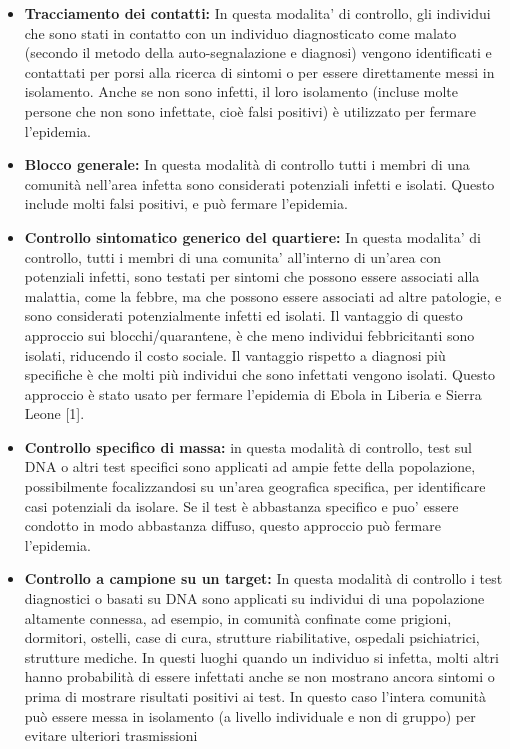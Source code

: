 \documentclass[onecolumn,journal]{IEEEtran}
\begin{document}
\begin{multicols}{2}
\begin{itemize}
  \item \textbf{Tracciamento dei contatti:} In questa modalita’ di controllo, gli individui che sono stati in contatto con un individuo diagnosticato come malato (secondo il metodo della auto-segnalazione e diagnosi) vengono identificati e contattati per porsi alla ricerca di sintomi o per essere direttamente messi in isolamento. Anche se non sono infetti, il loro isolamento (incluse molte persone che non sono infettate, cioè falsi positivi) è utilizzato per fermare l’epidemia.

  \item \textbf{Blocco generale:} In questa modalità di controllo tutti i membri di una comunità nell’area infetta sono considerati potenziali infetti e isolati. Questo include molti falsi positivi, e può fermare l’epidemia.

  \item \textbf{Controllo sintomatico generico del quartiere:} In questa modalita’ di controllo, tutti i membri di una comunita’ all’interno di un’area con potenziali infetti, sono testati per sintomi che possono essere associati alla malattia, come la febbre, ma che possono essere associati ad altre patologie, e sono considerati potenzialmente infetti ed isolati. Il vantaggio di questo approccio sui blocchi/quarantene, è che meno individui febbricitanti sono isolati, riducendo il costo sociale. Il vantaggio rispetto a diagnosi più specifiche è che molti più individui che sono infettati vengono isolati. Questo approccio è stato usato per fermare l’epidemia di Ebola in Liberia e Sierra Leone [1].

  \item \textbf{Controllo specifico di massa:} in questa modalità di controllo, test sul DNA o altri test specifici sono applicati ad ampie fette della popolazione, possibilmente focalizzandosi su un’area geografica specifica, per identificare casi potenziali da isolare. Se il test è abbastanza specifico e puo’ essere condotto in modo abbastanza diffuso, questo approccio può fermare l’epidemia.

  \item \textbf{Controllo a campione su un target:} In questa modalità di controllo i test diagnostici o basati su DNA sono applicati su individui di una popolazione altamente connessa, ad esempio, in comunità confinate come prigioni, dormitori, ostelli, case di cura, strutture riabilitative, ospedali psichiatrici, strutture mediche. In questi luoghi quando un individuo si infetta, molti altri hanno probabilità di essere infettati anche se non mostrano ancora sintomi o prima di mostrare risultati positivi ai test. In questo caso l’intera comunità può essere messa in isolamento (a livello individuale e non di gruppo) per evitare ulteriori trasmissioni



\end{itemize}
\end{multicols}
\end{document}
